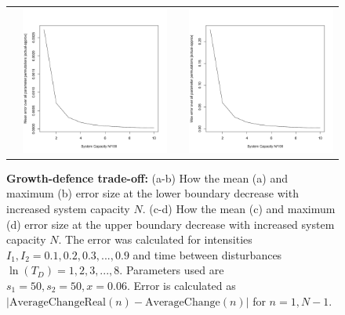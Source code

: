 \documentclass[preprint,10pt,reqno]{report}
\begin{document}
\begin{figure}[th]
\begin{tabular}{rrrr}
  &\includegraphics[width=2.5in]{GDtmeanerr.pdf} && \includegraphics[width=2.5in]{GDtmaxerr.pdf} \end{tabular}
   \caption{\textbf{Growth-defence trade-off:} (a-b)  How the mean (a) and maximum (b)  error size at the lower boundary decrease with increased system capacity $N$. (c-d) How the mean (c) and maximum (d) error size at the upper boundary decrease with increased system capacity $N$. The error was calculated for intensities $I_1,I_2=0.1,0.2,0.3,...,0.9$ and time between disturbances $\ln(T_D)=1,2,3,...,8.$ Parameters used are $s_1=50,s_2=50,x=0.06$. Error is calculated as $| \text{AverageChangeReal}(n) - \text{AverageChange}(n) |$ for $n=1,N-1$.}
     \label{fig:growthdefenceerrors}
    \end{figure}
    
\end{document}
